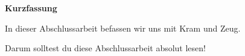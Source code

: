 
\thispagestyle{plain}
\begin{center}
    \Large
    \vspace{0.9cm}
    \textbf{Kurzfassung}
\end{center}

In dieser Abschlussarbeit befassen wir uns mit Kram und Zeug.

Darum solltest du diese Abschlussarbeit absolut lesen!